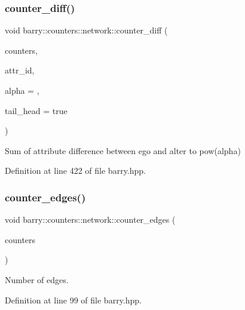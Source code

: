 \subsubsection{\texorpdfstring{counter\+\_\+diff()}{counter\_diff()}}
{\footnotesize\ttfamily void barry\+::counters\+::network\+::counter\+\_\+diff (\begin{DoxyParamCaption}\item[{\hyperlink{namespacebarry_1_1counters_1_1network_a3b3c590303d47840d1967372ae495d95}{Net\+Counter\+Vector} $\ast$}]{counters,  }\item[{\hyperlink{namespacebarry_a11dfc53ddb4672278319aa04f1e09a6c}{uint}}]{attr\+\_\+id,  }\item[{double}]{alpha = {},  }\item[{double}]{tail\+\_\+head = {\ttfamily true} }\end{DoxyParamCaption})\hspace{0.3cm}{\ttfamily [inline]}}



Sum of attribute difference between ego and alter to pow(alpha) 



Definition at line 422 of file barry.\+hpp.

\mbox{\label{namespacebarry_1_1counters_1_1network_a3c0a9e6c5697b3ec65827d405826bb33}} 
\subsubsection{\texorpdfstring{counter\+\_\+edges()}{counter\_edges()}}
{\footnotesize\ttfamily void barry\+::counters\+::network\+::counter\+\_\+edges (\begin{DoxyParamCaption}\item[{\hyperlink{namespacebarry_1_1counters_1_1network_a3b3c590303d47840d1967372ae495d95}{Net\+Counter\+Vector} $\ast$}]{counters }\end{DoxyParamCaption})\hspace{0.3cm}{\ttfamily [inline]}}



Number of edges. 



Definition at line 99 of file barry.\+hpp.

